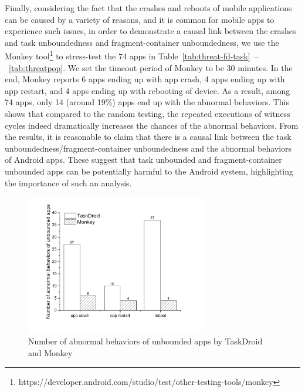 Finally, considering the fact that the crashes and reboots of mobile applications can be caused by a variety of reasons, and it is common for mobile apps to experience such issues, in order to demonstrate a causal link between the crashes and task unboundedness and fragment-container unboundedness, we use the Monkey tool\footnote{https://developer.android.com/studio/test/other-testing-tools/monkey} to stress-test the 74 apps in Table~\ref{tab:threat-fd-task}~--~\ref{tab:threatpop}. We set the timeout period of Monkey to be 30 minutes. In the end, Monkey reports 6 apps ending up with app crash, 4 apps ending up with app restart, and 4 apps ending up with rebooting of device. As a result, among 74 apps, only 14 (around 19\%) apps end up with the abnormal behaviors.  This shows that compared to the random testing, the repeated executions of witness cycles indeed dramatically increases the chances of the abnormal behaviors. From the results, it is reasonable to claim that there is a causal link between the task unboundedness/fragment-container unboundedness and the abnormal behaviors of Android apps. These suggest that task unbounded and fragment-container unbounded apps can be potentially harmful to
the Android system, highlighting the importance of such an analysis.


\begin{figure}[htbp]
	\centering
	\centering
	\includegraphics[width=8cm]{cmp-monkey.pdf}
	\caption{Number of abnormal behaviors of unbounded apps by TaskDroid and Monkey}
	\label{fig:cmp-monkey}
\end{figure}


